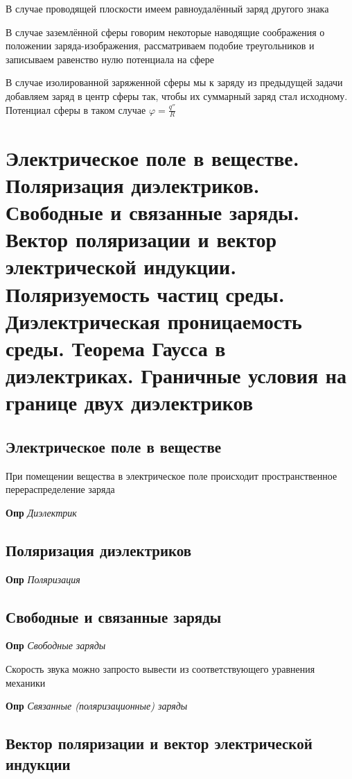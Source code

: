 \documentclass[a4paper, 14pt]{article}
\begin{document}
    В случае проводящей плоскости имеем равноудалённый заряд другого знака
    
    В случае заземлённой сферы говорим некоторые наводящие соображения о положении заряда-изображения, рассматриваем
    подобие треугольников и записываем равенство нулю потенциала на сфере
    
    В случае изолированной заряженной сферы мы к заряду из предыдущей задачи добавляем заряд в центр сферы так, чтобы
    их суммарный заряд стал исходному.
    Потенциал сферы в таком случае $\varphi = \frac{q''}{R}$
    
    \section{Электрическое поле в веществе.
    Поляризация диэлектриков.
    Свободные и связанные заряды.
    Вектор поляризации и вектор электрической индукции.
    Поляризуемость частиц среды.
    Диэлектрическая проницаемость среды.
    Теорема Гаусса в диэлектриках.
    Граничные условия на границе двух диэлектриков}
    
    \subsection{Электрическое поле в веществе}
    
    При помещении вещества в электрическое поле происходит пространственное перераспределение заряда
    
    \textbf{Опр} \textit{Диэлектрик}
    
    \subsection{Поляризация диэлектриков}
    
    \textbf{Опр} \textit{Поляризация}
    
    \subsection{Свободные и связанные заряды}
    
    \textbf{Опр} \textit{Свободные заряды}
    
    Скорость звука можно запросто вывести из соответствующего уравнения механики
    
    \textbf{Опр} \textit{Связанные (поляризационные) заряды}
    
    \subsection{Вектор поляризации и вектор электрической индукции}
    
\end{document}
